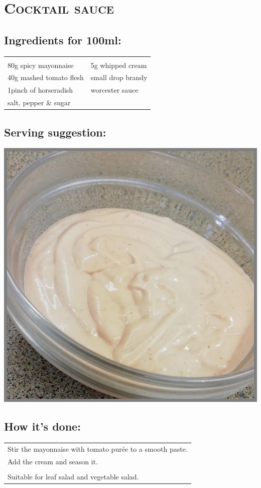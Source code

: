 \section{\textsc{Cocktail sauce}}

\subsection*{Ingredients for 100ml:}

\begin{tabular}{p{7.5cm} p{7.5cm}}
	& \\
	80g spicy mayonnaise & 5g whipped cream\\
	40g mashed tomato flesh & small drop brandy \\
	1pinch of horseradish & worcester sauce \\
	salt, pepper \& sugar 
\end{tabular}

\subsection*{Serving suggestion:}

\includegraphics[width=\textwidth]{img/d_cocktail.jpeg} \cite{dcocktail}

\subsection*{How it's done:}

\begin{tabular}{p{15cm}}
	\\
	Stir the mayonnaise with tomato purée to a smooth paste.\\
	Add the cream and season it.\\
	\\
	Suitable for leaf salad and vegetable salad.
\end{tabular}
